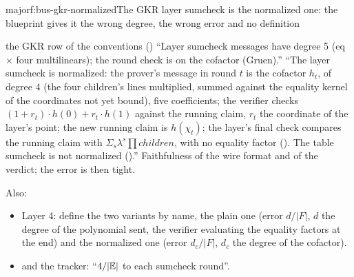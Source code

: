 \begin{finding}{major}{f:bus-gkr-normalized}{The GKR layer sumcheck is the normalized one: the blueprint gives it the wrong degree, the wrong error and no definition}
\begin{change}{the GKR row of the conventions ()}
\asis ``Layer sumcheck messages have degree 5 (eq × four multilinears); the round check is on
the cofactor (Gruen).''
\asproposed ``The layer sumcheck is normalized: the prover's message in round $t$ is the
cofactor $h_t$, of degree 4 (the four children's lines multiplied, summed against the equality
kernel of the coordinates not yet bound), five coefficients; the verifier checks
$(1 + r_t)·h(0) + r_t·h(1)$ against the running claim, $r_t$ the coordinate of the layer's
point; the new running claim is $h(χ_t)$; the layer's final check compares the running claim
with $Σ_s λ^s ∏ \mathit{children}$, with no equality factor (). The table
sumcheck is not normalized ().''
\reason Faithfulness of the wire format and of the verdict; the error is then tight.
\end{change}
Also:
\begin{itemize}
\item Layer 4: define the two variants by name, the plain one (error $d/|F|$, $d$ the degree of
  the polynomial sent, the verifier evaluating the equality factors at the end) and the
  normalized one (error $d_c/|F|$, $d_c$ the degree of the cofactor).
\item {} and the tracker: ``$4/|\mathbb{E}|$ to each sumcheck round''.
\end{itemize}
\end{finding}

